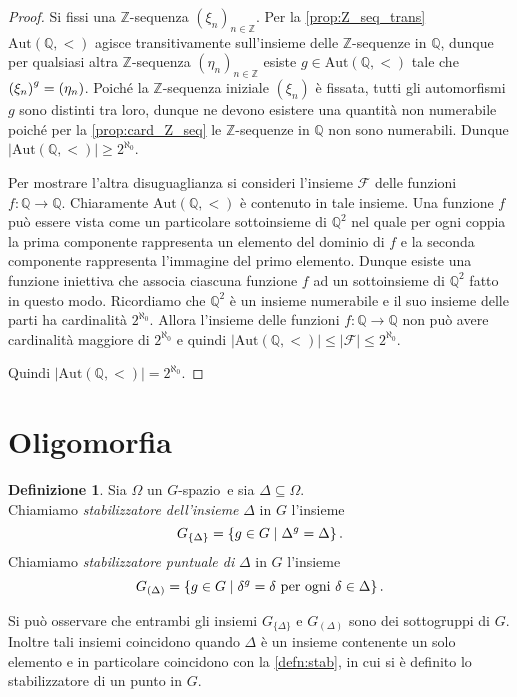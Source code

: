 \documentclass[12pt,a4paper,openright]{report}
\newcommand{\aut}{ \mathrm{Aut} ( \mathbb{Q},< ) } %
\newcommand{\Z}{\mathbb{Z}} %
\newcommand{\Q}{\mathbb{Q}} %
\newcommand{\0}{\setminus\{0\}} %
\newcommand{\Gsp}{$G$-spazio~} %
\theoremstyle{definition}
\newtheorem{defn}{Definizione}[chapter]
\theoremstyle{plain}
\begin{document}
\begin{proof}
    Si fissi una $\Z$-sequenza $\left(\xi_n\right)_{n \in \Z}$.
    Per la \cref{prop:Z_seq_trans} $\aut$ agisce transitivamente sull'insieme delle $\Z$-sequenze in $\Q$, dunque per qualsiasi altra $\Z$-sequenza $\left(\eta_n\right)_{n \in \Z}$ esiste $g \in \aut$ tale che $\left(\xi_n\right)^g=\nolinebreak \left(\eta_n\right)$. 
    Poiché la $\Z$-sequenza iniziale $\left(\xi_n\right)$ è fissata, tutti gli automorfismi $g$ sono distinti tra loro, dunque ne devono esistere una quantità non numerabile poiché per la \cref{prop:card_Z_seq} le $\Z$-sequenze in $\Q$ non sono numerabili. Dunque $|\aut|\geq 2^{\aleph_0}$.

    Per mostrare l'altra disuguaglianza si consideri l'insieme $\mathcal{F}$ delle funzioni $f:\Q \rightarrow \Q$. Chiaramente $\aut$ è contenuto in tale insieme. Una funzione $f$ può essere vista come un particolare sottoinsieme di $\Q^2$ nel quale per ogni coppia la prima componente rappresenta un elemento del dominio di $f$ e la seconda componente rappresenta l'immagine del primo elemento. Dunque esiste una funzione iniettiva che associa ciascuna funzione $f$ ad un sottoinsieme di $\Q^2$ fatto in questo modo. 
    Ricordiamo che $\Q^2$ è un insieme numerabile e il suo insieme delle parti ha cardinalità $2^{\aleph_0}$. Allora l'insieme delle funzioni $f:\Q \rightarrow \Q$ non può avere cardinalità maggiore di $2^{\aleph_0}$ e quindi $|\aut| \leq |\mathcal{F}| \leq  2^{\aleph_0}$. 
    
    Quindi $|\aut|= 2^{\aleph_0}$.
\end{proof}

\section{Oligomorfia}

\begin{defn}
    Sia $\Omega$ un \Gsp e sia $\Delta \subseteq \Omega$. \\ Chiamiamo \emph{stabilizzatore dell'insieme} $\Delta$ in $G$ l'insieme
    \[G_{\{\Delta\}}=\left\lbrace g \in G \centering\mid \Delta^g=\Delta \right\rbrace.\]
    Chiamiamo \emph{stabilizzatore puntuale di} $\Delta$ in $G$ l'insieme
    \[G_{(\Delta)}=\left\lbrace g \in G \centering\mid \delta^g=\delta \mbox{ per ogni } \delta \in \Delta \right\rbrace.\]
\end{defn}
Si può osservare che entrambi gli insiemi $G_{\{\Delta\}}$ e $G_{(\Delta)}$ sono dei sottogruppi di $G$. Inoltre tali insiemi coincidono quando $\Delta$ è un insieme contenente un solo elemento e in particolare coincidono con la \cref{defn:stab}, in cui si è definito lo stabilizzatore di un punto in $G$. 
\end{document}
